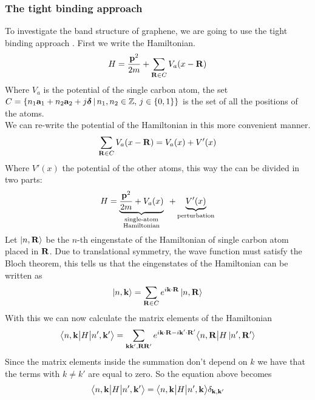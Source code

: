\subsubsection*{The tight binding approach}
To investigate the band structure of graphene, we are going to use the tight binding approach \cite{bloch1929quantenmechanik,slater1954simplified}.
First we write the Hamiltonian.
\begin{equation}
    H=\frac{\mathbf{p}^2}{2m} + \sum_{\mathbf{R}\in C}V_a(x-\mathbf{R})
    \label{eq:blochhamiltonian}
\end{equation}
Where $V_a$ is the potential of the single carbon atom, the set\\ $C=\left\{n_1\mathbf{a}_1 +n_2\mathbf{a}_2 + j\boldsymbol \delta\,|\,n_1,n_2\in \mathbb Z,\, j\in \{0,1\} \right\}$ is the set of all the positions of the atoms.\\ We can re-write the potential of the Hamiltonian in this more convenient manner.
\begin{equation}
    \sum_{\mathbf{R}\in C}V_a(x-\mathbf{R}) = V_a(x)+ V'(x)
\end{equation}
Where $V'(x)$ the potential of the other atoms, this way the can be divided in two parts:
\begin{equation}
    H=\underbrace{\frac{\mathbf{p}^2}{2m} + V_a(x)}_{\substack{\text{single-atom}\\\text{Hamiltonian}}} \,\,\,+ \underbrace{V'(x)}_\text{perturbation}
    \label{eq:blochhamiltoniandivided}
\end{equation}
Let $\ket{n,\mathbf{R}}$ be the $n$-th eingenstate of the Hamiltonian of single carbon atom placed in $\mathbf{R}$.
Due to translational symmetry, the wave function must satisfy the Bloch theorem, this tells us that the eingenstates of the Hamiltonian can be written as
\begin{equation}
    \ket{n,\mathbf{k}}=\sum_{\mathbf{R}\in C} e^{i\mathbf{k} \cdot \mathbf{R}}\ket{n,\mathbf{R}}
\end{equation}
With this we can now calculate the matrix elements of the Hamiltonian
\begin{equation}
    \big\langle n,\mathbf{k}\big|H\big| n',\mathbf{k}'\big\rangle=
    \sum_{\mathbf{k}\mathbf{k}',\mathbf{R}\mathbf{R}'}e^{i\mathbf{k}\cdot \mathbf{R}-i\mathbf{k}'\cdot\mathbf{R}'}
    \big\langle n,\mathbf{R}\big|H\ket{n',\mathbf{R}'}
\end{equation}
Since the matrix elements inside the summation don't depend on $k$ we have that the terms with $k\neq k'$ are equal to zero. So the equation above becomes
\[
    \big\langle n,\mathbf{k}\big|H\big| n',\mathbf{k}'\big\rangle= \big\langle n,\mathbf{k}\big|H\big| n',\mathbf{k}\big\rangle\delta_{\mathbf{k},\mathbf{k}'}
\]
